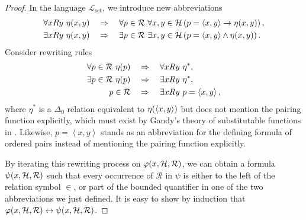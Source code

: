 \documentclass[11pt]{article}
\theoremstyle{plain}
\theoremstyle{definition}
\newcommand{\tuple}[1]{\left\langle #1 \right\rangle}
\begin{document}
\begin{proof}
  In the language $\mathcal{L}_\mathrm{set}$, we introduce new abbreviations
  \begin{align*}
    \forall x R y \ \eta\mleft(x, y\mright) \quad & \Rightarrow \quad \forall p \in \mathcal{R} \ \forall x, y \in \mathcal{H} \left(p = \tuple{x, y} \rightarrow \eta\mleft(x, y\mright)\right), \\
    \exists x R y \ \eta\mleft(x, y\mright) \quad & \Rightarrow \quad \exists p \in \mathcal{R} \ \exists x, y \in \mathcal{H} \left(p = \tuple{x, y} \land \eta\mleft(x, y\mright)\right).
  \end{align*}
  Consider rewriting rules
  \begin{align*}
    \forall p \in \mathcal{R} \ \eta\mleft(p\mright) \quad & \Rightarrow \quad \forall x R y \ \eta^*,           \\
    \exists p \in \mathcal{R} \ \eta\mleft(p\mright) \quad & \Rightarrow \quad \exists x R y \ \eta^*,           \\
    p \in \mathcal{R} \quad                                & \Rightarrow \quad \exists x R y \ p = \tuple{x, y},
  \end{align*}
  where $\eta^*$ is a $\Delta_0$ relation equivalent to $\eta\mleft(\tuple{x, y}\mright)$ but does not mention the pairing function explicitly, which must exist by Gandy's theory of substitutable functions in \cite{gandy74-set-functions}. Likewise, $p = \tuple{x, y}$ stands as an abbreviation for the defining formula of ordered pairs instead of mentioning the pairing function explicitly.

  By iterating this rewriting process on $\varphi\mleft(x, \mathcal{H}, \mathcal{R}\mright)$, we can obtain a formula $\psi\mleft(x, \mathcal{H}, \mathcal{R}\mright)$ such that every occurrence of $\mathcal{R}$ in $\psi$ is either to the left of the relation symbol $\in$, or part of the bounded quantifier in one of the two abbreviations we just defined. It is easy to show by induction that $\varphi\mleft(x, \mathcal{H}, \mathcal{R}\mright) \leftrightarrow \psi\mleft(x, \mathcal{H}, \mathcal{R}\mright)$.


\end{proof}
\end{document}
